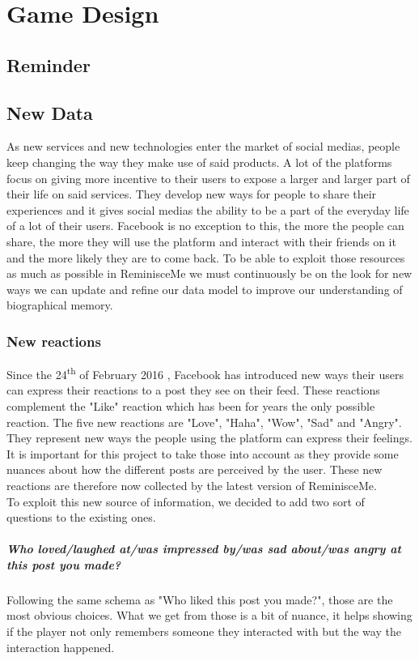 \chapter{Game Design}
\section{Reminder}
\section{New Data}
As new services and new technologies enter the market of social medias, people keep changing the way they make use of said products. A lot of the platforms focus on giving more incentive to their users to expose a larger and larger part of their life on said services. They develop new ways for people to share their experiences and it gives social medias the ability to be a part of the everyday life of a lot of their users. Facebook is no exception to this, the more the people can share, the more they will use the platform and interact with their friends on it and the more likely they are to come back. To be able to exploit those resources as much as possible in ReminisceMe we must continuously be on the look for new ways we can update and refine our data model to improve our understanding of biographical memory.
\subsection{New reactions}
Since the 24\textsuperscript{th} of February 2016 \cite{reactrelease}, Facebook has introduced new ways their users can express their reactions to a post they see on their feed. These reactions complement the "Like" reaction which has been for years the only possible reaction. The five new reactions are "Love", "Haha", "Wow", "Sad" and "Angry". They represent new ways the people using the platform can express their feelings. It is important for this project to take those into account as they provide some nuances about how the different posts are perceived by the user. These new reactions are therefore now collected by the latest version of ReminisceMe.\\
To exploit this new source of information, we decided to add two sort of questions to the existing ones.
\paragraph{Who loved/laughed at/was impressed by/was sad about/was angry at this post you made?}
Following the same schema as "Who liked this post you made?", those are the most obvious choices. What we get from those is a bit of nuance, it helps showing if the player not only remembers someone they interacted with but the way the interaction happened.
